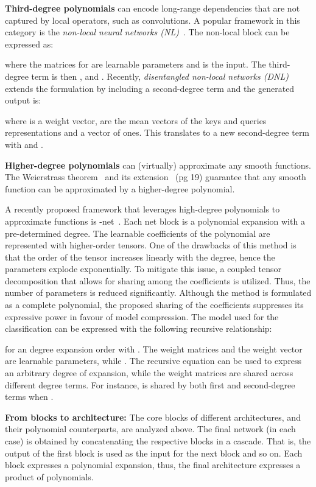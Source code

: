 \documentclass[runningheads]{llncs}
\begin{document}
\noindent\textbf{Third-degree polynomials} can encode long-range dependencies that are not captured by local operators, such as convolutions. 
A popular framework in this category is the \emph{non-local neural networks (NL)}~\cite{wang2018non}. The non-local block can be expressed as: 

where the matrices  for  are learnable parameters and  is the input. The third-degree term is then ,   and . 
Recently, \emph{disentangled non-local networks (DNL)}~\cite{yin2020disentangled} extends the formulation by including a second-degree term and the generated output is:

where  is a weight vector,  are the mean vectors of the keys and queries representations and  a vector of ones. This translates to a new second-degree term with  and .




\noindent\textbf{Higher-degree polynomials} can (virtually) approximate any smooth functions. The Weierstrass theorem~\cite{stone1948generalized} and its extension~\cite{nikol2013analysis} (pg 19) guarantee that any smooth function can be approximated by a higher-degree polynomial.

A recently proposed framework that leverages high-degree polynomials to approximate functions is -net~\cite{chrysos2020poly}. Each net block is a polynomial expansion with a pre-determined degree. The learnable coefficients of the polynomial are represented with higher-order tensors. One of the drawbacks of this method is that the order of the tensor increases linearly with the degree, hence the parameters explode exponentially. To mitigate this issue, a coupled tensor decomposition that allows for sharing among the coefficients is utilized. Thus, the number of parameters is reduced significantly. Although the method is formulated as a complete polynomial, the proposed sharing of the coefficients suppresses its expressive power in favour of model compression.
The model used for the classification can be expressed with the following recursive relationship:


for an degree expansion order with . The weight matrices  and the weight vector  are learnable parameters, while . The recursive equation can be used to express an arbitrary degree of expansion, while the weight matrices are shared across different degree terms. For instance,  is shared by both first and second-degree terms when . 


 

\noindent\textbf{From blocks to architecture:} The core blocks of different architectures, and their polynomial counterparts, are analyzed above. The final network (in each case) is obtained by concatenating the respective blocks in a cascade. That is, the output of the first block is used as the input for the next block and so on. Each block expresses a polynomial expansion, thus, the final architecture expresses a product of polynomials. 
\end{document}
